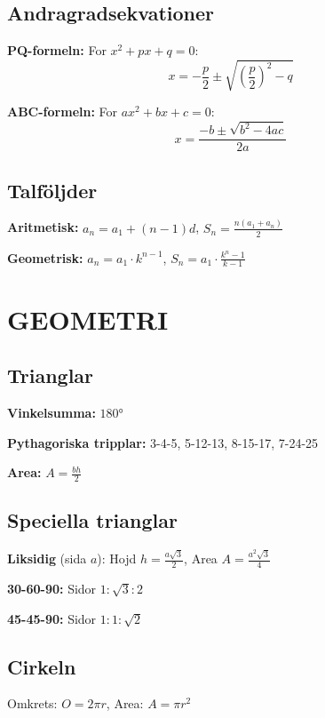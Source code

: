 \documentclass[11pt,a4paper]{article}
\begin{document}
\subsection{Andragradsekvationer}

\textbf{PQ-formeln:} For $x^2 + px + q = 0$:
\[ x = -\frac{p}{2} \pm \sqrt{\left(\frac{p}{2}\right)^2 - q} \]

\textbf{ABC-formeln:} For $ax^2 + bx + c = 0$:
\[ x = \frac{-b \pm \sqrt{b^2 - 4ac}}{2a} \]

\subsection{Talföljder}

\textbf{Aritmetisk:}
$a_n = a_1 + (n-1)d$, \quad $S_n = \frac{n(a_1 + a_n)}{2}$

\textbf{Geometrisk:}
$a_n = a_1 \cdot k^{n-1}$, \quad $S_n = a_1 \cdot \frac{k^n - 1}{k - 1}$

\section{GEOMETRI}

\subsection{Trianglar}

\textbf{Vinkelsumma:} $180°$


\textbf{Pythagoriska tripplar:} 3-4-5, 5-12-13, 8-15-17, 7-24-25

\textbf{Area:} $A = \frac{bh}{2}$

\subsection{Speciella trianglar}

\textbf{Liksidig} (sida $a$): Hojd $h = \frac{a\sqrt{3}}{2}$, Area $A = \frac{a^2\sqrt{3}}{4}$

\textbf{30-60-90:} Sidor $1 : \sqrt{3} : 2$

\textbf{45-45-90:} Sidor $1 : 1 : \sqrt{2}$

\subsection{Cirkeln}

Omkrets: $O = 2\pi r$, \quad Area: $A = \pi r^2$
\end{document}

